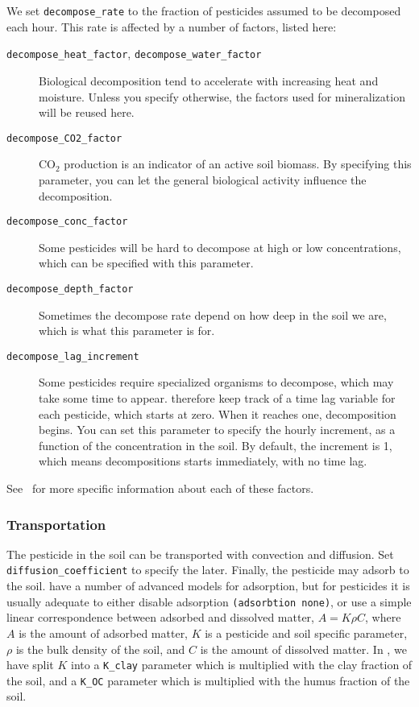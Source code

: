 \documentclass[a4paper,11pt]{article}
\begin{document}
We set \texttt{decompose\_rate} to the fraction of pesticides assumed
to be decomposed each hour.  This rate is affected by a number of
factors, listed here:
\begin{description}
\item[\texttt{decompose\_heat\_factor},
  \texttt{decompose\_water\_factor}] Biological
  decomposition\linebreak{} tend to accelerate with increasing heat
  and moisture.  Unless you specify otherwise, the factors used for
  mineralization will be reused here.
\item[\texttt{decompose\_CO2\_factor}] CO$_2$ production is an
  indicator of an active soil biomass.  By specifying this parameter,
  you can let the general biological activity influence the
  decomposition. 
\item[\texttt{decompose\_conc\_factor}] Some pesticides will be hard
  to decompose at high or low concentrations, which can be specified
  with this parameter. 
\item[\texttt{decompose\_depth\_factor}] Sometimes the decompose rate
  depend on how deep in the soil we are, which is what this parameter
  is for. 
\item[\texttt{decompose\_lag\_increment}] Some pesticides require
  specialized organisms to decompose, which may take some time to
  appear.  \Daisy{} therefore keep track of a time lag variable for
  each pesticide, which starts at zero.  When it reaches one,
  decomposition begins.  You can set this parameter to specify the
  hourly increment, as a function of the concentration in the soil.
  By default, the increment is 1, which means decompositions starts
  immediately, with no time lag.
\end{description}
See~\cite{dina81} for more specific information about each of these
factors. 

\subsubsection{Transportation}

The pesticide in the soil can be transported with convection and
diffusion.  Set \texttt{diffusion\_coefficient} to specify the later.
Finally, the pesticide may adsorb to the soil.  \Daisy{} have a number
of advanced models for adsorption, but for pesticides it is usually
adequate to either disable adsorption \texttt{(adsorbtion none)}, or
use a simple linear correspondence between adsorbed and dissolved
matter, $A = K \rho C$, where $A$ is the amount of adsorbed matter,
$K$ is a pesticide and soil specific parameter, $\rho$ is the bulk
density of the soil, and $C$ is the amount of dissolved matter.  In
\daisy{}, we have split $K$ into a \texttt{K\_clay} parameter which is
multiplied with the clay fraction of the soil, and a \texttt{K\_OC}
parameter which is multiplied with the humus fraction of the soil.
\end{document}
